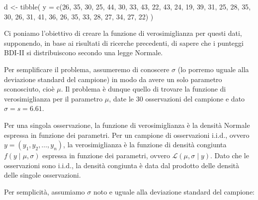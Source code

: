\documentclass[
]{memoir}
\newenvironment{Shaded}{\begin{snugshade}}{\end{snugshade}}
\newcommand{\AttributeTok}[1]{\textcolor[rgb]{0.77,0.63,0.00}{#1}}
\newcommand{\CommentTok}[1]{\textcolor[rgb]{0.56,0.35,0.01}{\textit{#1}}}
\newcommand{\DecValTok}[1]{\textcolor[rgb]{0.00,0.00,0.81}{#1}}
\newcommand{\FunctionTok}[1]{\textcolor[rgb]{0.00,0.00,0.00}{#1}}
\newcommand{\NormalTok}[1]{#1}
\newcommand{\OtherTok}[1]{\textcolor[rgb]{0.56,0.35,0.01}{#1}}
\newcommand{\SpecialCharTok}[1]{\textcolor[rgb]{0.00,0.00,0.00}{#1}}
\theoremstyle{definition}
\theoremstyle{definition}
\theoremstyle{definition}
\theoremstyle{definition}
\theoremstyle{remark}
\begin{document}
\begin{Shaded}
\begin{Highlighting}[]
\NormalTok{d }\OtherTok{\textless{}{-}} \FunctionTok{tibble}\NormalTok{(}
  \AttributeTok{y =} \FunctionTok{c}\NormalTok{(}\DecValTok{26}\NormalTok{, }\DecValTok{35}\NormalTok{, }\DecValTok{30}\NormalTok{, }\DecValTok{25}\NormalTok{, }\DecValTok{44}\NormalTok{, }\DecValTok{30}\NormalTok{, }\DecValTok{33}\NormalTok{, }\DecValTok{43}\NormalTok{, }\DecValTok{22}\NormalTok{, }\DecValTok{43}\NormalTok{, }\DecValTok{24}\NormalTok{, }
        \DecValTok{19}\NormalTok{, }\DecValTok{39}\NormalTok{, }\DecValTok{31}\NormalTok{, }\DecValTok{25}\NormalTok{, }\DecValTok{28}\NormalTok{, }\DecValTok{35}\NormalTok{, }\DecValTok{30}\NormalTok{, }\DecValTok{26}\NormalTok{, }\DecValTok{31}\NormalTok{, }\DecValTok{41}\NormalTok{, }\DecValTok{36}\NormalTok{, }
        \DecValTok{26}\NormalTok{, }\DecValTok{35}\NormalTok{, }\DecValTok{33}\NormalTok{, }\DecValTok{28}\NormalTok{, }\DecValTok{27}\NormalTok{, }\DecValTok{34}\NormalTok{, }\DecValTok{27}\NormalTok{, }\DecValTok{22}\NormalTok{)}
\NormalTok{  )}
\end{Highlighting}
\end{Shaded}

Ci poniamo l'obiettivo di creare la funzione di verosimiglianza per questi dati, supponendo, in base ai risultati di ricerche precedenti, di sapere che i punteggi BDI-II si distribuiscono secondo una legge Normale.

Per semplificare il problema, assumeremo di conoscere \(\sigma\) (lo porremo uguale alla deviazione standard del campione) in modo da avere un solo parametro sconosciuto, cioè \(\mu\). Il problema è dunque quello di trovare la funzione di verosimiglianza per il parametro \(\mu\), date le 30 osservazioni del campione e dato \(\sigma = s = 6.61\).

Per una singola osservazione, la funzione di verosimiglianza è la densità Normale espressa in funzione dei parametri. Per un campione di osservazioni i.i.d., ovvero \(y = (y_1, y_2, \dots, y_n)\), la verosimiglianza è la funzione di densità congiunta \(f(y \mid \mu, \sigma)\) espressa in funzione dei parametri, ovvero \(\mathcal{L}(\mu, \sigma \mid y)\). Dato che le osservazioni sono i.i.d., la densità congiunta è data dal prodotto delle densità delle singole osservazioni.

Per semplicità, assumiamo \(\sigma\) noto e uguale alla deviazione standard del campione:

\begin{Shaded}
\end{Shaded}
\end{document}
